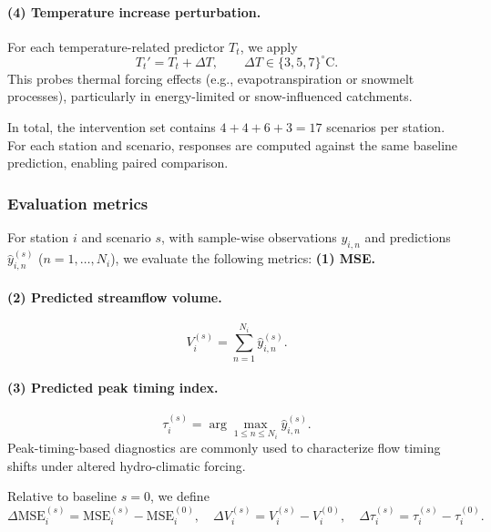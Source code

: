 \documentclass[11pt]{article}
\begin{document}
\paragraph{(4) Temperature increase perturbation.}
For each temperature-related predictor $T_t$, we apply
\begin{equation}
    T_t' = T_t + \Delta T,
    \qquad
    \Delta T\in\{3,5,7\}^{\circ}\mathrm{C}.
\end{equation}
This probes thermal forcing effects (e.g., evapotranspiration or snowmelt processes), particularly in energy-limited or snow-influenced catchments\cite{milly2020colorado}.

In total, the intervention set contains $4+4+6+3=17$ scenarios per station. For each station and scenario, responses are computed against the same baseline prediction, enabling paired comparison\cite{LouiseSlater2024_XAI_Hydrology}.

\subsubsection*{Evaluation metrics}

For station $i$ and scenario $s$, with sample-wise observations $y_{i,n}$ and predictions $\hat y_{i,n}^{(s)}$ ($n=1,\dots,N_i$), we evaluate the following metrics\cite{WRR_RMSE,Nse}: \textbf{(1) MSE.}

\paragraph{(2) Predicted streamflow volume.}
\begin{equation}
    V_{i}^{(s)} = \sum_{n=1}^{N_i}\hat y_{i,n}^{(s)}.
\end{equation}

\paragraph{(3) Predicted peak timing index.}
\begin{equation}
    \tau_{i}^{(s)} = \arg\max_{1\le n\le N_i}\hat y_{i,n}^{(s)}.
\end{equation}
Peak-timing-based diagnostics are commonly used to characterize flow timing shifts under altered hydro-climatic forcing\cite{bloschl2017changing}.

Relative to baseline $s=0$, we define
\begin{equation}
    \Delta\mathrm{MSE}_{i}^{(s)} = \mathrm{MSE}_{i}^{(s)}-\mathrm{MSE}_{i}^{(0)},
    \quad
    \Delta V_{i}^{(s)} = V_{i}^{(s)}-V_{i}^{(0)},
    \quad
    \Delta\tau_{i}^{(s)} = \tau_{i}^{(s)}-\tau_{i}^{(0)}.
\end{equation}
\end{document}
